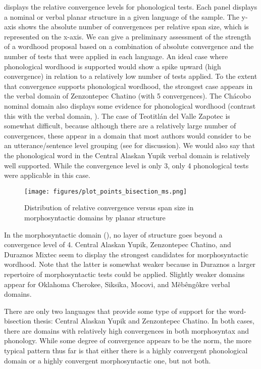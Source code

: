 \documentclass[output=paper,draftmode]{langscibook}
\begin{document}
 displays the relative convergence levels for phonological tests. Each panel displays a nominal or verbal planar structure in a given language of the sample.
The y-axis shows the absolute number of convergences per relative span size, which is represented on the x-axis. 
We can give a preliminary assessment of the strength of a wordhood proposal based on a combination of absolute convergence and the number of tests that were applied in each language. 
An ideal case where phonological wordhood is supported would show a spike upward (high convergence) in relation to a relatively low number of tests applied.
To the extent that convergence supports phonological wordhood, the strongest case appears in the verbal domain of Zenzontepec Chatino (with 5 convergences). The Chácobo nominal domain also displays some evidence for phonological wordhood (contrast this with the verbal domain, \citealt{tallmanconstituency2021}). The case of Teotitlán del Valle Zapotec is somewhat difficult, because although there are a relatively large number of convergences, these appear in a domain that most authors would consider to be an utterance/sentence level grouping (see \citet{chapters/07-Zapotec} for discussion). We would also say that the phonological word in the Central Alaskan Yupik verbal domain is relatively well supported. While the convergence level is only 3, only 4 phonological tests were applicable in this case.

\begin{figure}
    \texttt{[image: figures/plot\_points\_bisection\_ms.png]}
    \caption{Distribution of relative convergence versus span size in morphosyntactic domains by planar structure}
    \label{fig:bisection-ms}
\end{figure}

In the morphosyntactic domain (), no layer of structure goes beyond a convergence level of 4. Central Alaskan Yupik, Zenzontepec Chatino, and Du\-raz\-nos Mixtec seem to display the strongest candidates for morphosyntactic wordhood. Note that the latter is somewhat weaker because in Duraznos a larger repertoire of morphosyntactic tests could be applied. Slightly weaker domains appear for Oklahoma Cherokee, Siksika, Mocovi, and Mẽbêngôkre verbal domains.

There are only two languages that provide some type of support for the word-bisection thesis: Central Alaskan Yupik and Zenzontepec Chatino. In both cases, there are domains with relatively high convergences in both morphosyntax and phonology. While some degree of convergence appears to be the norm, the more typical pattern thus far is that either there is a highly convergent phonological domain or a highly convergent morphosyntactic one, but not both. 
\end{document}
